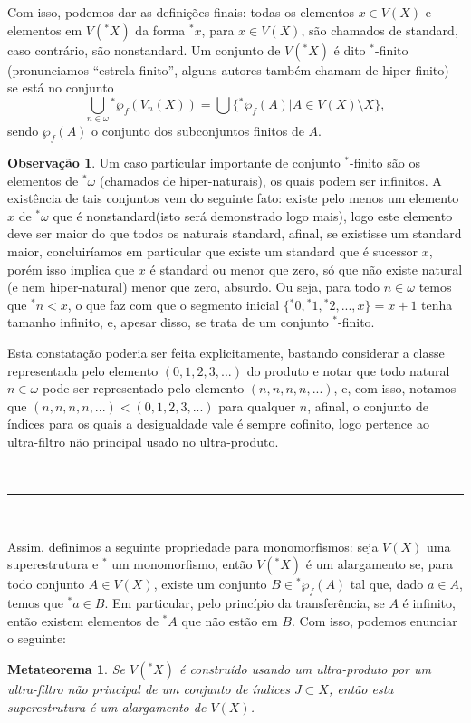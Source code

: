 \documentclass[12pt,a4paper]{article}
\newtheorem{mthrm}[mydef]{Metateorema}
\def\eop{\hfill\rule{2.5mm}{2.5mm} \\ }
\theoremstyle{definition}
\newtheorem{obs}[mydef]{Observação}
\begin{document}
Com isso, podemos dar as definições finais: todas os elementos $x\in V(X)$ e elementos em $V({^*X})$ da forma $^*x$, para $x\in V(X)$, são chamados de standard, caso contrário, são nonstandard. Um conjunto de $V({^*X})$ é dito $^*$-finito (pronunciamos ``estrela-finito'', alguns autores também chamam de hiper-finito) se está no conjunto $$\bigcup_{n\in \omega}{^* \wp_f (V_n(X))}=\bigcup \{ {^* \wp_f(A)} | A\in V(X)\setminus X \},$$ sendo $\wp_f(A)$ o conjunto dos subconjuntos finitos de $A$. 

\begin{obs}

Um caso particular importante de conjunto $^*$-finito são os elementos de $^*\omega$ (chamados de hiper-naturais), os quais podem ser infinitos. A existência de tais conjuntos vem do seguinte fato: existe pelo menos um elemento $x$ de $^*\omega$ que é nonstandard(isto será demonstrado logo mais), logo este elemento deve ser maior do que todos os naturais standard, afinal, se existisse um standard maior, concluiríamos em particular que existe um standard que é sucessor $x$, porém isso implica que $x$ é standard ou menor que zero, só que não existe natural (e nem hiper-natural) menor que zero, absurdo. Ou seja, para todo $n\in \omega$ temos que $^*n<x$, o que faz com que o segmento inicial $\{{^*0},{^*1},{^*2},...,x\}=x+1$ tenha tamanho infinito, e, apesar disso, se trata de um conjunto $^*$-finito.

Esta constatação poderia ser feita explicitamente, bastando considerar a classe representada pelo elemento $(0,1,2,3,...)$ do produto e notar que todo natural $n\in \omega$ pode ser representado pelo elemento $(n,n,n,n,...)$, e, com isso, notamos que $(n,n,n,n,...)<(0,1,2,3,...)$ para qualquer $n$, afinal, o conjunto de índices para os quais a desigualdade vale é sempre cofinito, logo pertence ao ultra-filtro não principal usado no ultra-produto.

\ \eop
\end{obs}

Assim, definimos a seguinte propriedade para monomorfismos: seja $V(X)$ uma superestrutura e $^*$ um monomorfismo, então $V({^*X})$ é um alargamento se, para todo conjunto $A\in V(X)$, existe um conjunto $B\in {^*\wp_f(A)}$ tal que, dado $a\in A$, temos que $^*a\in B$. Em particular, pelo princípio da transferência, se $A$ é infinito, então existem elementos de $^*A$ que não estão em $B$. Com isso, podemos enunciar o seguinte: 

\begin{mthrm}
    
        Se $V({^*X})$ é construído usando um ultra-produto por um ultra-filtro não principal de um conjunto de índices $J\subset X$, então esta superestrutura é um alargamento de $V(X)$.
    
\end{mthrm}
\end{document}
